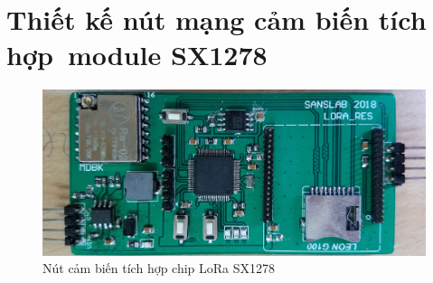 \section{Thiết kế nút mạng cảm biến tích hợp~module SX1278}
\begin{figure}[h]
	\begin{center}
		\includegraphics[scale=0.45]{image/hinh3_1}
	\end{center}
	\caption{Nút cảm biến tích hợp chip LoRa SX1278}
	\label{moduleSX1278}
\end{figure}
